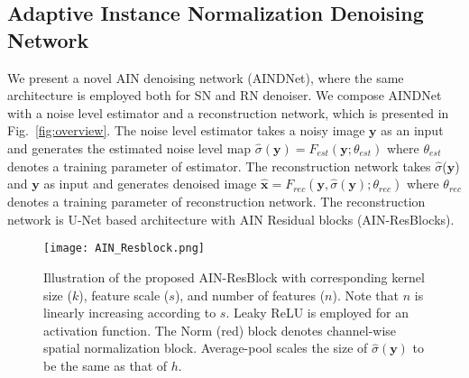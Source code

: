 \documentclass[10pt,twocolumn,letterpaper]{article}
\begin{document}
 


\subsection{Adaptive Instance Normalization Denoising Network}
We present a novel AIN denoising network (AINDNet), where the same architecture is employed both for SN and RN denoiser.
We compose AINDNet with a noise level estimator and a reconstruction network, which is presented in Fig.~\ref{fig:overview}.
The noise level estimator takes a noisy image $\textbf{y}$ as an input and generates the estimated noise level map
$\hat{\sigma}(\textbf{y}) = F_{est}(\textbf{y};\theta_{est})$ where $\theta_{est}$ denotes a training parameter of estimator.
The reconstruction network takes $\hat{\sigma}$($\textbf{y}$) and $\textbf{y}$ as input and generates denoised image $\hat{\textbf{x}} = F_{rec}(\textbf{y},\hat{\sigma}(\textbf{y});\theta_{rec})$ where $\theta_{rec}$ denotes a training parameter of reconstruction network.
The reconstruction network is U-Net based architecture with AIN Residual blocks (AIN-ResBlocks).

\begin{figure}[t]
	\centering				
	\texttt{[image: AIN\_Resblock.png]} 
	\caption{Illustration of the proposed AIN-ResBlock with corresponding kernel size ($k$), feature scale ($s$), and number of features ($n$). Note that $n$ is linearly increasing according to $s$. Leaky ReLU is employed for an activation function. The Norm (red) block denotes channel-wise spatial normalization block. Average-pool scales the size of $\hat{\sigma}(\textbf{y})$ to be the same as that of $h$.}	
	\label{fig:AIN_Resblock}	
\end{figure}
\end{document}
